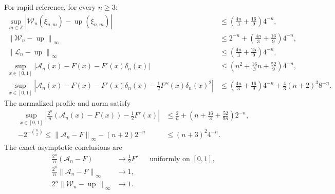 \documentclass[11pt,oneside]{article}
\theoremstyle{definition}
\theoremstyle{remark}
\newcommand{\Z}{\mathbb Z}
\newcommand{\Up}{\operatorname{up}}
\newcommand{\norm}[1]{\left\lVert #1\right\rVert}
\newcommand{\abs}[1]{\left\lvert #1\right\rvert}
\begin{document}
For rapid reference, for every $n\ge3$:
\begin{align*}
\sup_{m\in\Z}
 \abs{\mathcal W_n(\xi_{n,m})-\Up(\xi_{n,m})}
 &\le\left(\frac{4n}{3}+\frac{16}{9}\right)4^{-n},\\
\norm{\mathcal W_n-\Up}_\infty
 &\le2^{-n}+\left(\frac{4n}{3}+\frac{16}{9}\right)4^{-n},\\
\norm{\mathcal L_n-\Up}_\infty
 &\le\left(\frac{4n}{3}+\frac{25}{9}\right)4^{-n},\\
\sup_{x\in[0,1]}
 \abs{\mathcal A_n(x)-F(x)-F'(x)\delta_n(x)}
 &\le\left(n^2+\frac{16}{3}n+\frac{52}{9}\right)4^{-n},\\
\sup_{x\in[0,1]}
 \abs{\mathcal A_n(x)-F(x)-F'(x)\delta_n(x)
       -\tfrac12F''(x)\delta_n(x)^2}
 &\le\left(\frac{4n}{3}+\frac{16}{9}\right)4^{-n}
      +\frac43(n+2)^3 8^{-n}.
\end{align*}
The normalized profile and norm satisfy
\begin{align*}
 \sup_{x\in[0,1]}
 \abs{\frac{2^n}{n}(\mathcal A_n(x)-F(x))-\frac12F'(x)}
 &\le \frac2n+\left(n+\frac{16}{3}+\frac{52}{9n}\right)2^{-n},\\
 -2^{-\binom n2}
 \le \norm{\mathcal A_n-F}_\infty-(n+2)2^{-n}
 &\le(n+3)^2 4^{-n}.
\end{align*}
The exact asymptotic conclusions are
\begin{align*}
 \frac{2^n}{n}(\mathcal A_n-F)
 &\longrightarrow\frac12F' &&\text{uniformly on }[0,1],\\
 \frac{2^n}{n}\norm{\mathcal A_n-F}_\infty
 &\longrightarrow1,\\
 2^n\norm{\mathcal W_n-\Up}_\infty
 &\longrightarrow1.
\end{align*}
\end{document}
